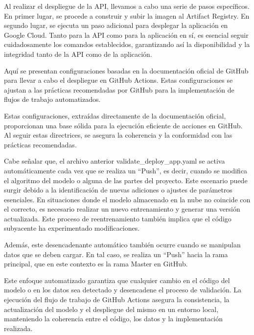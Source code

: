 Al realizar el despliegue de la API, llevamos a cabo una serie de pasos específicos. En primer lugar, se procede a construir y subir la imagen al Artifact Registry. En segundo lugar, se ejecuta un paso adicional para desplegar la aplicación en Google Cloud. Tanto para la API como para la aplicación en sí, es esencial seguir cuidadosamente los comandos establecidos, garantizando así la disponibilidad y la integridad tanto de la API como de la aplicación.

\newpage

Aquí se presentan configuraciones basadas en la documentación oficial de GitHub para llevar a cabo el despliegue en GitHub Actions. Estas configuraciones se ajustan a las prácticas recomendadas por GitHub para la implementación de flujos de trabajo automatizados. \newline

Estas configuraciones, extraídas directamente de la documentación oficial, proporcionan una base sólida para la ejecución eficiente de acciones en GitHub. Al seguir estas directrices, se asegura la coherencia y la conformidad con las prácticas recomendadas. \newline

Cabe señalar que, el archivo anterior validate\_deploy\_app.yaml se activa automáticamente cada vez que se realiza un ``Push'', es decir, cuando se modifica el algoritmo del modelo o alguna de las partes del proyecto. Este escenario puede surgir debido a la identificación de nuevas adiciones o ajustes de parámetros esenciales. En situaciones donde el modelo almacenado en la nube no coincide con el correcto, es necesario realizar un nuevo entrenamiento y generar una versión actualizada. Este proceso de reentrenamiento también implica que el código subyacente ha experimentado modificaciones. \newline

Además, este desencadenante automático también ocurre cuando se manipulan datos que se deben cargar. En tal caso, se realiza un ``Push'' hacia la rama principal, que en este contexto es la rama Master en GitHub. \newline

Este enfoque automatizado garantiza que cualquier cambio en el código del modelo o en los datos sea detectado y desencadene el proceso de validación. La ejecución del flujo de trabajo de GitHub Actions asegura la consistencia, la actualización del modelo y el despliegue del mismo en un entorno local, manteniendo la coherencia entre el código, los datos y la implementación realizada. \newline

